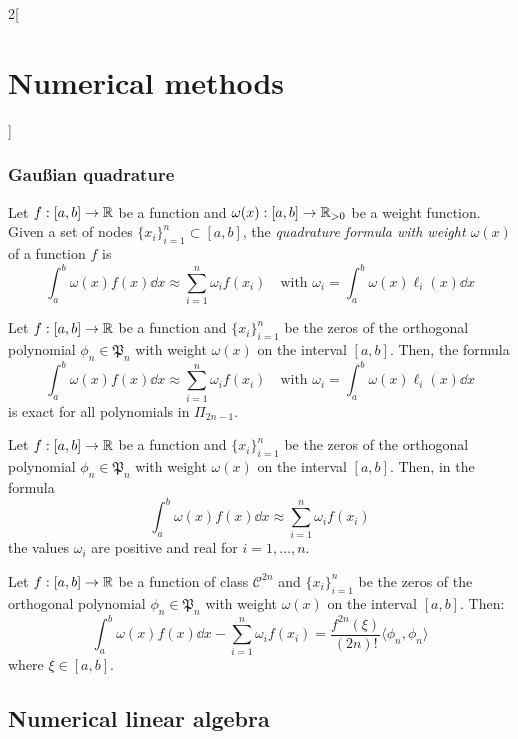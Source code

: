 \documentclass[../../../main.tex]{subfiles}
\begin{document}
\begin{multicols}{2}[\section{Numerical methods}]
  \subsubsection{Gau\ss ian quadrature}
  \begin{definition}
    Let $f:[a,b]\rightarrow\mathbb{R}$ be a function and $\omega(x):[a,b]\rightarrow\mathbb{R}_{>0}$ be a weight function. Given a set of nodes $\{x_i\}_{i=1}^n\subset[a,b]$, the \emph{quadrature formula with weight $\omega(x)$} of a function $f$ is $$\int_a^b\omega(x)f(x)\dd{x}\approx\sum_{i=1}^n\omega_if(x_i)\quad\!\text{with }\omega_i=\int_a^b\omega(x)\ell_i(x)\dd{x}$$
  \end{definition}
  \begin{lemma}
    Let $f:[a,b]\rightarrow\mathbb{R}$ be a function and $\{x_i\}_{i=1}^n$ be the zeros of the orthogonal polynomial $\phi_n\in\mathfrak{P}_n$ with weight $\omega(x)$ on the interval $[a,b]$. Then, the formula $$\int_a^b\omega(x)f(x)\dd{x}\approx\sum_{i=1}^n\omega_if(x_i)\quad\!\text{with }\omega_i=\int_a^b\omega(x)\ell_i(x)\dd{x}$$ is exact for all polynomials in $\Pi_{2n-1}$.
  \end{lemma}
  \begin{proposition}
    Let $f:[a,b]\rightarrow\mathbb{R}$ be a function and $\{x_i\}_{i=1}^n$ be the zeros of the orthogonal polynomial $\phi_n\in\mathfrak{P}_n$ with weight $\omega(x)$ on the interval $[a,b]$. Then, in the formula $$\int_a^b\omega(x)f(x)\dd{x}\approx\sum_{i=1}^n\omega_if(x_i)$$ the values $\omega_i$ are positive and real for $i=1,\ldots,n$.
  \end{proposition}
  \begin{theorem}
    Let $f:[a,b]\rightarrow\mathbb{R}$ be a function of class $\mathcal{C}^{2n}$ and $\{x_i\}_{i=1}^n$ be the zeros of the orthogonal polynomial $\phi_n\in\mathfrak{P}_n$ with weight $\omega(x)$ on the interval $[a,b]$. Then: $$\int_a^b\omega(x)f(x)\dd{x}-\sum_{i=1}^n\omega_if(x_i)=\frac{f^{2n}(\xi)}{(2n)!}\langle\phi_n,\phi_n\rangle$$ where $\xi\in[a,b]$.
  \end{theorem}
  \subsection{Numerical linear algebra}

\end{multicols}
\end{document}

